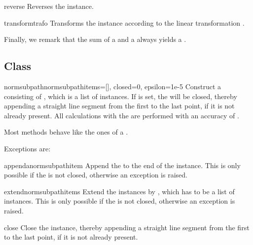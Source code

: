 \begin{methoddesc}{reverse}{}
  Reverses the  instance. 
\end{methoddesc}

\begin{methoddesc}{transform}{trafo}
  Transforms the  instance according to the linear
  transformation . 
\end{methoddesc}

Finally, we remark that the sum of a  and a 
always yields a . 


\subsection{Class }

\begin{classdesc}{normsubpath}{normsubpathitems=[], closed=0,
    epsilon=1e-5}
  Construct a  consisting of
  , which is a list of 
  instances. If  is set, the  will be
  closed, thereby appending a straight line segment from the first to
  the last point, if it is not already present. All calculations with
  the  are performed with an accuracy of . 
\end{classdesc}

Most  methods behave like the ones of a
. 

Exceptions are:

\begin{methoddesc}{append}{anormsubpathitem}
  Append the  to the end of the
   instance. This is only possible if the
   is not closed, otherwise an exception is raised. 
\end{methoddesc}

\begin{methoddesc}{extend}{normsubpathitems}
  Extend the  instances by ,
  which has to be a list of  instances. This is
  only possible if the  is not closed, otherwise an
  exception is raised. 
\end{methoddesc}

\begin{methoddesc}{close}{}
  Close the  instance, thereby appending a straight
  line segment from the first to the last point, if it is not already
  present. 
\end{methoddesc}

